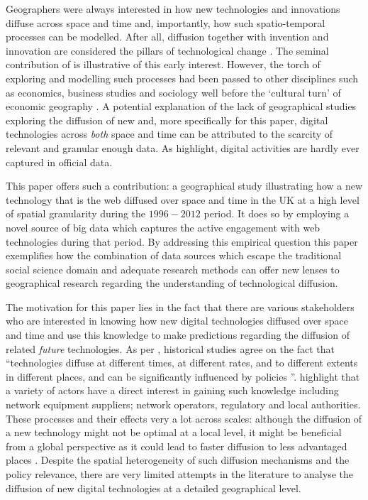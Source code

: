 \documentclass[
  authoryear,
  preprint,
  3p]{elsarticle}
\begin{document}
Geographers were always interested in how new technologies and
innovations diffuse across space and time and, importantly, how such
spatio-temporal processes can be modelled. After all, diffusion together
with invention and innovation are considered the pillars of
technological change \citep{das2022diffusion}. The seminal contribution
of \citet{hagerstrand1968innovation} is illustrative of this early
interest. However, the torch of exploring and modelling such processes
had been passed to other disciplines such as economics, business studies
and sociology well before the `cultural turn' of economic geography
\citep{perkins2005international}. A potential explanation of the lack of
geographical studies exploring the diffusion of new and, more
specifically for this paper, digital technologies across \emph{both}
space and time can be attributed to the scarcity of relevant and
granular enough data. As \citet{zook2022mapping} highlight, digital
activities are hardly ever captured in official data.

This paper offers such a contribution: a geographical study illustrating
how a new technology that is the web diffused over space and time in the
UK at a high level of spatial granularity during the \(1996-2012\)
period. It does so by employing a novel source of big data which
captures the active engagement with web technologies during that period.
By addressing this empirical question this paper exemplifies how the
combination of data sources which escape the traditional social science
domain and adequate research methods can offer new lenses to
geographical research regarding the understanding of technological
diffusion.

The motivation for this paper lies in the fact that there are various
stakeholders who are interested in knowing how new digital technologies
diffused over space and time and use this knowledge to make predictions
regarding the diffusion of related \emph{future} technologies. As per
\citet{leibowicz2016representing}, historical studies agree on the fact
that ``technologies diffuse at different times, at different rates, and
to different extents in different places, and can be significantly
influenced by policies \citep{victor1993}''. \citet{meade2021modelling}
highlight that a variety of actors have a direct interest in gaining
such knowledge including network equipment suppliers; network operators,
regulatory and local authorities. These processes and their effects very
a lot across scales: although the diffusion of a new technology might
not be optimal at a local level, it might be beneficial from a global
perspective as it could lead to faster diffusion to less advantaged
places \citep{leibowicz2016representing}. Despite the spatial
heterogeneity of such diffusion mechanisms and the policy relevance,
there are very limited attempts in the literature to analyse the
diffusion of new digital technologies at a detailed geographical level.
\end{document}
